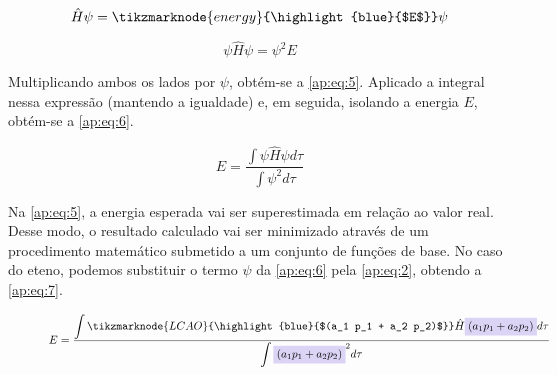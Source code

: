 
\begin{figure}[htb]
    \vspace{2\baselineskip}
\begin{equation}
\label{ap:eq:4}
    \hat{H} \psi = \tikzmarknode{energy}{\highlight{blue}{$E$}} \psi
\end{equation}
\end{figure}

\begin{equation}
\label{ap:eq:5}
    \psi \hat{H} \psi = \psi^2 E
\end{equation}


Multiplicando ambos os lados por $\psi$, obtém-se a \autoref{ap:eq:5}. Aplicado a integral nessa expressão (mantendo a igualdade) e, em seguida, isolando a energia $E$, obtém-se a \autoref{ap:eq:6}.

\begin{equation}
\label{ap:eq:6}
    E = \frac{\displaystyle \int \psi \hat{H} \psi d\tau}{\displaystyle \int \psi^2 d\tau}
\end{equation}

Na \autoref{ap:eq:5}, a energia esperada vai ser superestimada em relação ao valor real. Desse modo, o resultado calculado vai ser minimizado através de um procedimento matemático submetido a um conjunto de funções de base. No caso do eteno, podemos substituir o termo $\psi$ da \autoref{ap:eq:6} pela \autoref{ap:eq:2}, obtendo a \autoref{ap:eq:7}.

\begin{figure}[htb]
    \vspace{2\baselineskip}
\begin{equation}
\label{ap:eq:7}
    E = \frac{\displaystyle \int \tikzmarknode{LCAO}{\highlight{blue}{$(a_1 p_1 + a_2 p_2)$}} \hat{H} \highlight{blue}{$(a_1 p_1 + a_2 p_2)$} d\tau}{\displaystyle \int \highlight{blue}{$(a_1 p_1 + a_2 p_2)$}^2 d\tau}
\end{equation}
\end{figure}

